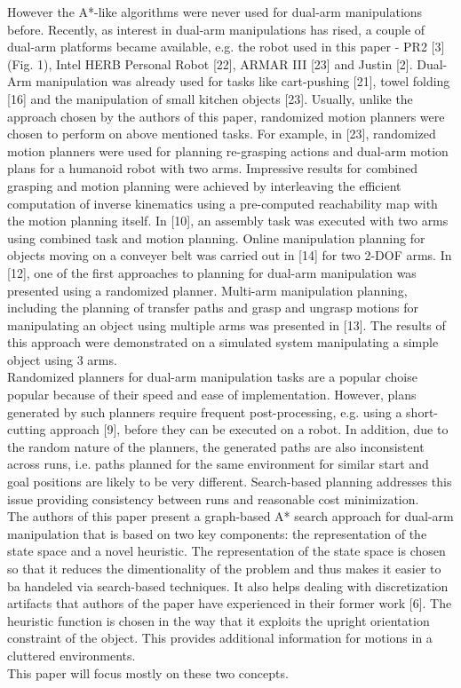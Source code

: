\documentclass[11pt]{article}
\begin{document}
However the A*-like algorithms were never used for dual-arm manipulations before. Recently, as interest in dual-arm manipulations has rised, a couple of dual-arm platforms became available, e.g. the robot used in this paper - PR2 [3] (Fig. 1), Intel HERB Personal Robot [22], ARMAR III [23] and Justin [2]. Dual-Arm manipulation was already used for tasks like cart-pushing [21], towel folding [16] and the manipulation of small kitchen objects [23]. Usually, unlike the approach chosen by the authors of this paper, randomized motion planners were chosen to perform on above mentioned tasks. For example, in [23], randomized motion planners were used for planning re-grasping actions and dual-arm motion plans for a humanoid robot with two arms. Impressive results for combined grasping and motion planning were achieved by interleaving the efficient computation of inverse kinematics using a pre-computed reachability map with the motion planning itself. In [10], an assembly task was executed with two arms using combined task and motion planning. Online manipulation planning for objects moving on a conveyer belt was carried out in [14] for two 2-DOF arms. In [12], one of the first approaches to planning for dual-arm manipulation was presented using a randomized planner. Multi-arm manipulation planning, including the planning of transfer paths and grasp and ungrasp motions for manipulating an object using multiple arms was presented in [13]. The results of this approach were demonstrated on a simulated system manipulating a simple object using 3 arms.\\
Randomized planners for dual-arm manipulation tasks are a popular choise popular because of their speed and ease of implementation. However, plans generated by such planners require frequent post-processing, e.g. using a short- cutting approach [9], before they can be executed on a robot. In addition, due to the random nature of the planners, the generated paths are also inconsistent across runs, i.e. paths planned for the same environment for similar start and goal positions are likely to be very different. Search-based planning addresses this issue providing consistency between runs and reasonable cost minimization.\\
The authors of this paper present a graph-based A* search approach for dual-arm manipulation that is based on two key components: the representation of the state space and a novel heuristic. 
The representation of the state space is chosen so that it reduces the dimentionality of the problem and thus makes it easier to ba handeled via search-based techniques. It also helps dealing with discretization artifacts that authors of the paper have experienced in their former work [6].
The heuristic function is chosen in the way that it exploits the upright orientation constraint of the object. This provides additional information for motions in a cluttered environments.\\
This paper will focus mostly on these two concepts.
\end{document}
